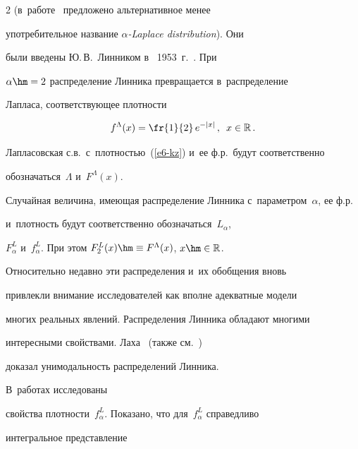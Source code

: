 \begin{multicols}{2}
(в~работе~\cite{Pillai1985} предложено альтернативное менее


употребительное название \textit{$\alpha$-Laplace distribution}). Они


были введены Ю.\,В.~Линником в~ 1953~г.~\cite{Linnik1953}. При


$\alpha\hm=2$ распределение Линника превращается в~распределение


Лапласа, соответствующее плотности


\begin{equation}


f^{\Lambda}(x)=\fr{1}{2}\,e^{-|x|}\,,\enskip


x\in\mathbb{R}\,.


\label{e6-kz}


\end{equation}


Лапласовская с.в.\ с~плот\-ностью~(\ref{e6-kz}) и~ее ф.р.\ будут соответственно


обозначаться~$\Lambda$ и~$F^{\Lambda}(x)$.





Случайная величина, имеющая распределение Линника с~параметром~$\alpha$, ее ф.р.\


и~плот\-ность будут соответственно обозначаться~$L_{\alpha}$,


$F_{\alpha}^{L}$ и~$f_{\alpha}^{L}$. При этом $F_2^{L}(x)\hm\equiv


F^{\Lambda}(x)$, $x\hm\in\mathbb{R}$.





Относительно недавно эти распределения и~их обобщения вновь


привлекли внимание исследователей как вполне адекватные модели


многих реальных явлений. Распределения Линника обладают многими


интересными свойствами. Лаха~\cite{Laha1961} (также см.~\cite{Lukacs1970}) 


доказал унимодальность распределений Линника. 


В~работах \cite{KotzOstrovskiiHayfavi1995a, KotzOstrovskiiHayfavi1995b} исследованы 


свойства плотности~$f_{\alpha}^{L}$. Показано, что для~$f_{\alpha}^{L}$ справедливо


интегральное представление


\begin{equation}



\end{equation}
\end{multicols}
